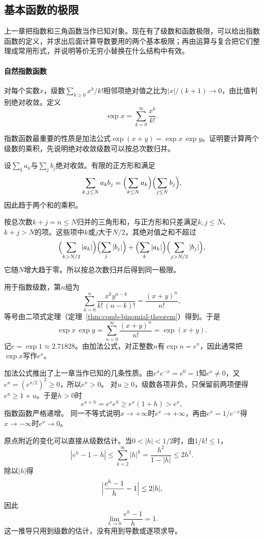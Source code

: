 \subsection{基本函数的极限}
\label{sec:ru-elementary-limits}

上一章把指数和三角函数当作已知对象。现在有了级数和函数极限，可以给出指数函数的定义，并求出后面计算导数要用的两个基本极限；再由运算与复合把它们整理成常用形式，并说明等价无穷小替换在什么结构中有效。

\paragraph{自然指数函数}
对每个实数$x$，级数$\sum_{k\geq0}x^k/k!$相邻项绝对值之比为$|x|/(k+1)\to0$，由比值判别绝对收敛。定义
\begin{equation}
 \exp x=\sum_{k=0}^\infty\frac{x^k}{k!}.
 \label{eq:ru-exp-series}
\end{equation}

指数函数最重要的性质是加法公式$\exp(x+y)=\exp x\,\exp y$。证明要计算两个级数的乘积，先说明绝对收敛级数可以按总次数归并。

设$\sum_ka_k$与$\sum_jb_j$绝对收敛。有限的正方形和满足
\[
 \sum_{k,j\leq N}a_kb_j=\Bigl(\sum_{k\leq N}a_k\Bigr)\Bigl(\sum_{j\leq N}b_j\Bigr),
\]
因此趋于两个和的乘积。

按总次数$k+j=n\leq N$归并的三角形和，与正方形和只差满足$k,j\leq N$、$k+j>N$的项。这些项中$k$或$j$大于$N/2$，其绝对值之和不超过
\[
 \Bigl(\sum_{k>N/2}|a_k|\Bigr)\Bigl(\sum_j|b_j|\Bigr)+\Bigl(\sum_k|a_k|\Bigr)\Bigl(\sum_{j>N/2}|b_j|\Bigr),
\]
它随$N$增大趋于零。所以按总次数归并后得到同一极限。

用于指数级数，第$n$组为
\[
 \sum_{k=0}^n\frac{x^ky^{n-k}}{k!\,(n-k)!}=\frac{(x+y)^n}{n!},
\]
等号由二项式定理（定理~\ref{thm:comb-binomial-theorem}）得到。于是
\begin{equation}
 \exp x\,\exp y=\sum_{n=0}^\infty\frac{(x+y)^n}{n!}=\exp(x+y).
 \label{eq:ru-exp-addition}
\end{equation}
记$e=\exp1\approx2.71828$。由加法公式，对正整数$n$有$\exp n=e^n$，因此通常把$\exp x$写作$e^x$。

加法公式推出了上一章当作已知的几条性质。由$e^xe^{-x}=e^0=1$知$e^x\neq0$，又$e^x=(e^{x/2})^2\geq0$，所以$e^x>0$。
对$u\geq0$，级数各项非负，只保留前两项便得$e^u\geq1+u$。于是$h>0$时
\[
 e^{x+h}=e^xe^h\geq e^x(1+h)>e^x,
\]
指数函数严格递增。
同一不等式说明$x\to+\infty$时$e^x\to+\infty$，再由$e^x=1/e^{-x}$得$x\to-\infty$时$e^x\to0$。

原点附近的变化可以直接从级数估计。当$0<|h|<1/2$时，由$1/k!\leq1$，
\[
 |e^h-1-h|\leq\sum_{k=2}^\infty|h|^k=\frac{h^2}{1-|h|}\leq2h^2.
\]
除以$|h|$得
\[
 \Bigl|\frac{e^h-1}h-1\Bigr|\leq2|h|,
\]
因此
\begin{equation}
 \lim_{h\to0}\frac{e^h-1}{h}=1.
 \label{eq:ru-exp-basic-limit}
\end{equation}
这一推导只用到级数的估计，没有用到导数或逐项求导。

